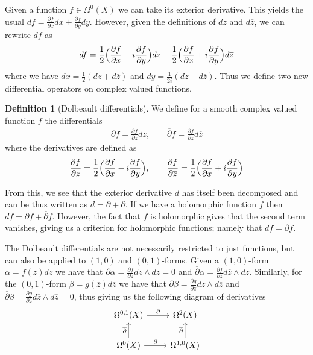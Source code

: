 \documentclass[11pt]{report}
\theoremstyle{definition}
\newtheorem{defn}[thm]{Definition}
\begin{document}
Given a function $f \in \Omega^0(X)$ we can take its exterior derivative. This yields the usual $df = \frac{\partial f}{\partial x}dx + \frac{\partial f}{\partial y}dy$. However, given the definitions of $dz$ and $d\overline{z}$, we can rewrite $df$ as 
\[ 
  df = \frac{1}{2}\Bigl(\frac{\partial f}{\partial x} - i\frac{\partial f}{\partial y}\Bigr)dz + \frac{1}{2}\Bigl(\frac{\partial f}{\partial x} + i\frac{\partial f}{\partial y}\Bigr)d\overline{z} 
\]
where we have  $dx = \frac{1}{2}(dz+d\overline{z})$ and $dy = \frac{1}{2i}(dz - d\overline{z})$. Thus we define two new differential operators on complex valued functions.
\begin{defn}[Dolbeault differentials]
  We define for a smooth complex valued function $f$ the differentials
  \begin{align*} 
    \partial f = \frac{\partial f}{\partial z}dz, 
    \qquad 
    \overline{\partial}f = \frac{\partial f}{\partial \overline{z}}d\overline{z}
  \end{align*}
  where the derivatives are defined as \[
  \frac{\partial f}{\partial z} = \frac{1}{2}\Bigl(\frac{\partial f}{\partial x} - i\frac{\partial f}{\partial y}\Bigr), 
  \qquad 
  \frac{\partial f}{\partial \overline{z}} = \frac{1}{2}\Bigl(\frac{\partial f}{\partial x} + i\frac{\partial f}{\partial y}\Bigr)\]
\end{defn}

From this, we see that the exterior derivative $d$ has itself been decomposed and can be thus written as $d = \partial + \overline{\partial}$. If we have a holomorphic function $f$ then $df = \partial f + \overline{\partial} f$. However, the fact that $f$ is holomorphic gives that the second term vanishes, giving us a criterion for holomorphic functions; namely that $df = \partial f$.

The Dolbeault differentials are not necessarily restricted to just functions, but can also be applied to $(1,0)$ and $(0,1)$-forms. Given a $(1,0)$-form $\alpha = f(z)dz$ we have that $\partial\alpha = \frac{\partial f}{\partial z}dz \wedge dz = 0$ and $\overline{\partial}\alpha = \frac{\partial f}{\partial z}d\overline{z} \wedge dz$. Similarly, for the $(0,1)$-form $\beta = g(\overline{z})d\overline{z}$ we have that $\partial\beta = \frac{\partial g}{\partial z}dz \wedge d\overline{z}$ and $\overline{\partial}\beta = \frac{\partial g}{\partial \overline{z}}d\overline{z}\wedge d\overline{z}=0$, thus giving us the following diagram of derivatives
\[
  \begin{tikzcd}
    \Omega^{0,1}(X) \arrow{r}{\partial} & \Omega^2(X) \\
    \Omega^0(X) \arrow{r}{\partial}  \arrow{u}{\overline{\partial}} & \Omega^{1,0}(X) \arrow{u}{\overline{\partial}}
  \end{tikzcd}  
\]
\end{document}
